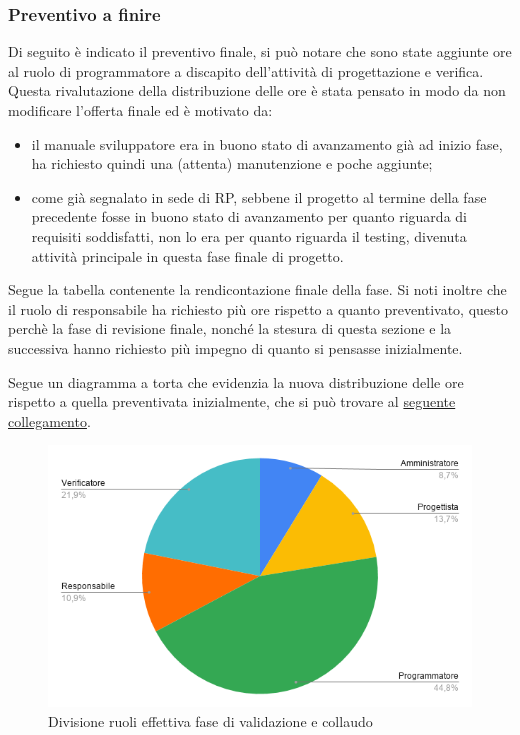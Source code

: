     \subsubsection{Preventivo a finire}
        Di seguito è indicato il preventivo finale, si può notare che sono state aggiunte ore al ruolo di programmatore a discapito dell'attività di progettazione e verifica. Questa rivalutazione della distribuzione delle ore è stata pensato in modo da non modificare l'offerta finale ed è motivato da:
        \begin{itemize}
            \item il manuale sviluppatore era in buono stato di avanzamento già ad inizio fase, ha richiesto quindi una (attenta) manutenzione e poche aggiunte;
            \item come già segnalato in sede di RP, sebbene il progetto al termine della fase precedente fosse in buono stato di avanzamento per quanto riguarda di requisiti soddisfatti, non lo era per quanto riguarda il testing, divenuta attività principale in questa fase finale di progetto.
        \end{itemize}
        Segue la tabella contenente la rendicontazione finale della fase.
        \def\salarycontent{
            {Amministratore,16,20,320},
            {Analista,      0,25,0},
            {Progettista,   25,22,550},
            {Programmatore, 82,15,1230},
            {Responsabile,  20,30,600},
            {Verificatore,  40,15,600},
            {Totale,        183,127,3300},
        }
        Si noti inoltre che il ruolo di responsabile ha richiesto più ore rispetto a quanto preventivato, questo perchè la fase di revisione finale, nonché la stesura di questa sezione e la successiva hanno richiesto più impegno di quanto si pensasse inizialmente.
        
        Segue un diagramma a torta che evidenzia la nuova distribuzione delle ore rispetto a quella preventivata inizialmente, che si può trovare al \hyperref[image:verifica_ruoli]{seguente collegamento}. 
        \begin{figure}[H]
            \centering
            \includegraphics[width=\textwidth]{source/img/verifica_ruoli_modificato.png}
            \caption{Divisione ruoli effettiva fase di validazione e collaudo}
        \end{figure}
